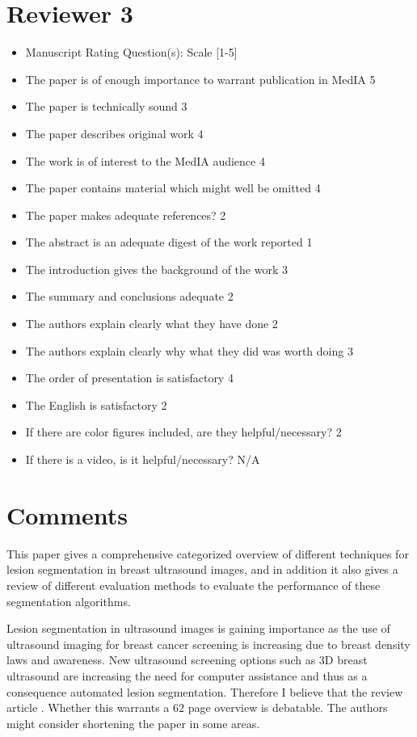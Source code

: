 \documentclass[]{tufte-handout}
\begin{document}
\section{Reviewer 3}
\begin{itemize}[noitemsep,topsep=0pt,parsep=0pt,partopsep=0pt]
\small
\item Manuscript Rating Question(s):  Scale   [1-5]
\item The paper is of enough importance to warrant publication in MedIA  5
\item The paper is technically sound  3
\item The paper describes original work  4
\item The work is of interest to the MedIA audience  4
\item The paper contains material which might well be omitted  4
\item The paper makes adequate references?  2
\item The abstract is an adequate digest of the work reported  1
\item The introduction gives the background of the work  3
\item The summary and conclusions adequate  2
\item The authors explain clearly what they have done  2
\item The authors explain clearly why what they did was worth doing  3
\item The order of presentation is satisfactory  4
\item The English is satisfactory  2
\item If there are color figures included, are they helpful/necessary?  2
\item If there is a video, is it helpful/necessary?  N/A
\end{itemize}

\section{Comments}

This paper gives a comprehensive categorized overview of different techniques for lesion segmentation in breast ultrasound images, and in addition it also gives a review of different evaluation methods to evaluate the performance of these segmentation algorithms.

Lesion segmentation in ultrasound images is gaining importance as the use of ultrasound imaging for breast cancer screening is increasing due to breast density laws and awareness. New ultrasound screening options such as 3D breast ultrasound are increasing the need for computer assistance and thus as a consequence automated lesion segmentation. Therefore I believe that the review article . Whether this warrants a 62 page overview is debatable. The authors might consider shortening the paper in some areas.
\end{document}

